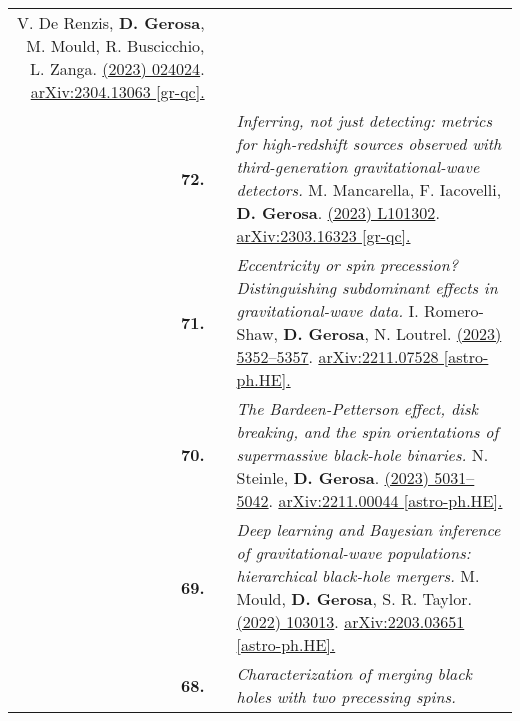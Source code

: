 {\begin{longtable}{rp{0.3cm}p{15.8cm}}
\newline{}
V. De Renzis, \textbf{D. Gerosa}, M. Mould, R. Buscicchio, L. Zanga.
\newline{}
\href{https://journals.aps.org/prd/abstract/10.1103/PhysRevD.108.024024}{\prd 108 (2023) 024024}. \href{https://arxiv.org/abs/2304.13063}{arXiv:2304.13063 [gr-qc].}
\vspace{0.09cm}\\
%
\textbf{72.} & & \textit{Inferring, not just detecting: metrics for high-redshift sources observed with third-generation gravitational-wave detectors.}
\newline{}
M. Mancarella, F. Iacovelli, \textbf{D. Gerosa}.
\newline{}
\href{https://journals.aps.org/prd/abstract/10.1103/PhysRevD.107.L101302}{\prdl 107 (2023) L101302}. \href{https://arxiv.org/abs/2303.16323}{arXiv:2303.16323 [gr-qc].}
\vspace{0.09cm}\\
%
\textbf{71.} & & \textit{Eccentricity or spin precession? Distinguishing subdominant effects in gravitational-wave data.}
\newline{}
I. Romero-Shaw, \textbf{D. Gerosa}, N. Loutrel.
\newline{}
\href{https://doi.org/10.1093/mnras/stad031}{\mnras 519 (2023) 5352–5357}. \href{https://arxiv.org/abs/2211.07528}{arXiv:2211.07528 [astro-ph.HE].}
\vspace{0.09cm}\\
%
\textbf{70.} & & \textit{The Bardeen-Petterson effect, disk breaking, and the spin orientations of supermassive black-hole binaries.}
\newline{}
N. Steinle, \textbf{D. Gerosa}.
\newline{}
\href{https://doi.org/10.1093/mnras/stac3821}{\mnras 519 (2023) 5031–5042}. \href{https://arxiv.org/abs/2211.00044}{arXiv:2211.00044 [astro-ph.HE].}
\vspace{0.09cm}\\
%
\textbf{69.} & & \textit{Deep learning and Bayesian inference of gravitational-wave populations: hierarchical black-hole mergers.}
\newline{}
M. Mould, \textbf{D. Gerosa}, S. R. Taylor.
\newline{}
\href{https://journals.aps.org/prd/abstract/10.1103/PhysRevD.106.103013}{\prd 106 (2022) 103013}. \href{https://arxiv.org/abs/2203.03651}{arXiv:2203.03651 [astro-ph.HE].}
\vspace{0.09cm}\\
%
\textbf{68.} & & \textit{Characterization of merging black holes with two precessing spins.}

\end{longtable}}
